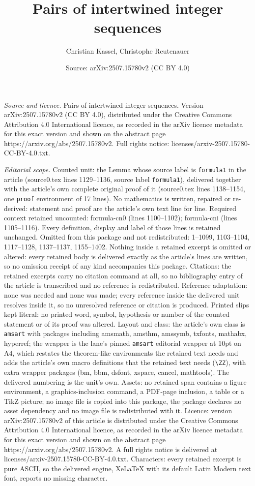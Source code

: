 \documentclass[10pt,a4paper]{amsart}
\title[Pairs of intertwined integer sequences]{Pairs of intertwined integer sequences}
\author{Christian Kassel, Christophe Reutenauer}
\date{Source: arXiv:2507.15780v2 (CC BY 4.0)}
\begin{document}
\maketitle

\noindent\emph{Source and licence.} Pairs of intertwined integer sequences. Version arXiv:2507.15780v2 (CC BY 4.0), distributed under the Creative Commons Attribution 4.0 International licence, as recorded in the arXiv licence metadata for this exact version and shown on the abstract page https://arxiv.org/abs/2507.15780v2. Full rights notice: licenses/arxiv-2507.15780-CC-BY-4.0.txt.\par\smallskip

\noindent\textit{Editorial scope.} Counted unit: the Lemma whose source label is \texttt{formula1} in the article (source0.tex lines 1129--1136, source label \texttt{formula1}), delivered together with the article's own complete original proof of it (source0.tex lines 1138--1154, one \texttt{proof} environment of 17 lines). No mathematics is written, repaired or re-derived: statement and proof are the article's own text line for line. Required context retained uncounted: formula-cn0 (lines 1100--1102); formula-cni (lines 1105--1116). Every definition, display and label of those lines is retained unchanged. Omitted from this package and not redistributed: 1--1099, 1103--1104, 1117--1128, 1137--1137, 1155--1402. Nothing inside a retained excerpt is omitted or altered: every retained body is delivered exactly as the article's lines are written, so no omission receipt of any kind accompanies this package. Citations: the retained excerpts carry no citation command at all, so no bibliography entry of the article is transcribed and no reference is redistributed. Reference adaptation: none was needed and none was made; every reference inside the delivered unit resolves inside it, so no unresolved reference or citation is produced. Printed slips kept literal: no printed word, symbol, hypothesis or number of the counted statement or of its proof was altered. Layout and class: the article's own class is \texttt{amsart} with packages including amsmath, amsthm, amssymb, txfonts, mathabx, hyperref; the wrapper is the lane's pinned \texttt{amsart} editorial wrapper at 10pt on A4, which restates the theorem-like environments the retained text needs and adds the article's own macro definitions that the retained text needs (\texttt{\textbackslash ZZ}), with extra wrapper packages (bm, bbm, dsfont, xspace, cancel, mathtools). The delivered numbering is the unit's own. Assets: no retained span contains a figure environment, a graphics-inclusion command, a PDF-page inclusion, a table or a TikZ picture; no image file is copied into this package, the package declares no asset dependency and no image file is redistributed with it. Licence: version arXiv:2507.15780v2 of this article is distributed under the Creative Commons Attribution 4.0 International licence, as recorded in the arXiv licence metadata for this exact version and shown on the abstract page https://arxiv.org/abs/2507.15780v2. A full rights notice is delivered at licenses/arxiv-2507.15780-CC-BY-4.0.txt. Characters: every retained excerpt is pure ASCII, so the delivered engine, XeLaTeX with its default Latin Modern text font, reports no missing character.
\end{document}
